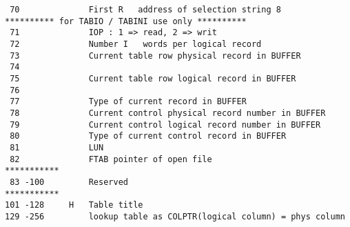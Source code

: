 \begin{verbatim}
 70              First R   address of selection string 8
********** for TABIO / TABINI use only **********
 71              IOP : 1 => read, 2 => writ
 72              Number I   words per logical record
 73              Current table row physical record in BUFFER
 74
 75              Current table row logical record in BUFFER
 76
 77              Type of current record in BUFFER
 78              Current control physical record number in BUFFER
 79              Current control logical record number in BUFFER
 80              Type of current control record in BUFFER
 81              LUN
 82              FTAB pointer of open file
***********
 83 -100         Reserved
***********
101 -128     H   Table title
129 -256         lookup table as COLPTR(logical column) = phys column
\end{verbatim}

